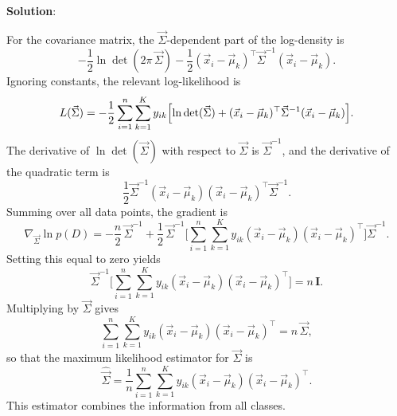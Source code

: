 \documentclass[submit]{../harvardml}
\newenvironment{solution}{
    \vspace{2mm}
    \color{blue}\noindent\textbf{Solution}:
}{}
\begin{document}
\begin{solution}
For the covariance matrix, the $\vec{\Sigma}$-dependent part of the log-density is
\[
-\frac{1}{2}\ln\det(2\pi\,\vec{\Sigma}) - \frac{1}{2}(\vec{x}_i-\vec{\mu}_k)^\top \vec{\Sigma}^{-1}(\vec{x}_i-\vec{\mu}_k).
\]
Ignoring constants, the relevant log-likelihood is
\[
L(\vec{\Sigma}) = -\frac{1}{2}\sum_{i=1}^n \sum_{k=1}^K y_{ik}\Bigl[\ln\det(\vec{\Sigma}) + (\vec{x}_i-\vec{\mu}_k)^\top \vec{\Sigma}^{-1}(\vec{x}_i-\vec{\mu}_k)\Bigr].
\]
The derivative of $\ln\det(\vec{\Sigma})$ with respect to $\vec{\Sigma}$ is $\vec{\Sigma}^{-1}$, and the derivative of the quadratic term is
\[
\frac{1}{2}\vec{\Sigma}^{-1}(\vec{x}_i-\vec{\mu}_k)(\vec{x}_i-\vec{\mu}_k)^\top\vec{\Sigma}^{-1}.
\]
Summing over all data points, the gradient is
\[
\nabla_{\vec{\Sigma}}\ln p(D) = -\frac{n}{2}\,\vec{\Sigma}^{-1} + \frac{1}{2}\,\vec{\Sigma}^{-1}\Biggl[\sum_{i=1}^n \sum_{k=1}^K y_{ik}(\vec{x}_i-\vec{\mu}_k)(\vec{x}_i-\vec{\mu}_k)^\top\Biggr]\vec{\Sigma}^{-1}.
\]
Setting this equal to zero yields
\[
\vec{\Sigma}^{-1}\Biggl[\sum_{i=1}^n \sum_{k=1}^K y_{ik}(\vec{x}_i-\vec{\mu}_k)(\vec{x}_i-\vec{\mu}_k)^\top\Biggr] = n\,\mathbf{I}.
\]
Multiplying by $\vec{\Sigma}$ gives
\[
\sum_{i=1}^n \sum_{k=1}^K y_{ik}(\vec{x}_i-\vec{\mu}_k)(\vec{x}_i-\vec{\mu}_k)^\top = n\,\vec{\Sigma},
\]
so that the maximum likelihood estimator for $\vec{\Sigma}$ is
\[
\hat{\vec{\Sigma}} = \frac{1}{n}\sum_{i=1}^n \sum_{k=1}^K y_{ik}(\vec{x}_i-\vec{\mu}_k)(\vec{x}_i-\vec{\mu}_k)^\top.
\]
This  estimator combines the information from all classes.

\end{solution}

\end{document}
